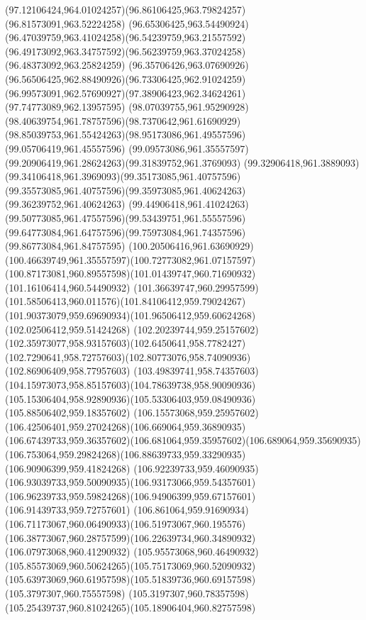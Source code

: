 {{	\curveto(97.12106424,964.01024257)(96.86106425,963.79824257)(96.81573091,963.52224258)
	\curveto(96.65306425,963.54490924)(96.47039759,963.41024258)(96.54239759,963.21557592)
	\curveto(96.49173092,963.34757592)(96.56239759,963.37024258)(96.48373092,963.25824259)
	\curveto(96.35706426,963.07690926)(96.56506425,962.88490926)(96.73306425,962.91024259)
	\curveto(96.99573091,962.57690927)(97.38906423,962.34624261)(97.74773089,962.13957595)
	\curveto(98.07039755,961.95290928)(98.40639754,961.78757596)(98.7370642,961.61690929)
	\curveto(98.85039753,961.55424263)(98.95173086,961.49557596)(99.05706419,961.45557596)
	\curveto(99.09573086,961.35557597)(99.20906419,961.28624263)(99.31839752,961.3769093)
	\curveto(99.32906418,961.3889093)(99.34106418,961.3969093)(99.35173085,961.40757596)
	\curveto(99.35573085,961.40757596)(99.35973085,961.40624263)(99.36239752,961.40624263)
	\curveto(99.44906418,961.41024263)(99.50773085,961.47557596)(99.53439751,961.55557596)
	\curveto(99.64773084,961.64757596)(99.75973084,961.74357596)(99.86773084,961.84757595)
	\curveto(100.20506416,961.63690929)(100.46639749,961.35557597)(100.72773082,961.07157597)
	\curveto(100.87173081,960.89557598)(101.01439747,960.71690932)(101.16106414,960.54490932)
	\curveto(101.36639747,960.29957599)(101.58506413,960.011576)(101.84106412,959.79024267)
	\curveto(101.90373079,959.69690934)(101.96506412,959.60624268)(102.02506412,959.51424268)
	\curveto(102.20239744,959.25157602)(102.35973077,958.93157603)(102.6450641,958.7782427)
	\curveto(102.7290641,958.72757603)(102.80773076,958.74090936)(102.86906409,958.77957603)
	\curveto(103.49839741,958.74357603)(104.15973073,958.85157603)(104.78639738,958.90090936)
	\curveto(105.15306404,958.92890936)(105.53306403,959.08490936)(105.88506402,959.18357602)
	\curveto(106.15573068,959.25957602)(106.42506401,959.27024268)(106.669064,959.36890935)
	\curveto(106.67439733,959.36357602)(106.681064,959.35957602)(106.689064,959.35690935)
	\curveto(106.753064,959.29824268)(106.88639733,959.33290935)(106.90906399,959.41824268)
	\curveto(106.92239733,959.46090935)(106.93039733,959.50090935)(106.93173066,959.54357601)
	\curveto(106.96239733,959.59824268)(106.94906399,959.67157601)(106.91439733,959.72757601)
	\curveto(106.861064,959.91690934)(106.71173067,960.06490933)(106.51973067,960.195576)
	\curveto(106.38773067,960.28757599)(106.22639734,960.34890932)(106.07973068,960.41290932)
	\curveto(105.95573068,960.46490932)(105.85573069,960.50624265)(105.75173069,960.52090932)
	\curveto(105.63973069,960.61957598)(105.51839736,960.69157598)(105.3797307,960.75557598)
	\curveto(105.3197307,960.78357598)(105.25439737,960.81024265)(105.18906404,960.82757598)
}}
